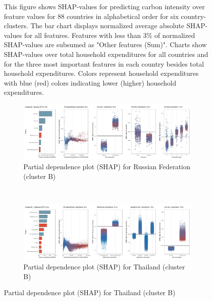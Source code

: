 \begin{figure}[ht!]
    \begin{subcaption2}
     This figure shows SHAP-values for predicting carbon intensity over feature values for 88 countries in alphabetical order for six country-clusters. The bar chart displays normalized average absolute SHAP-values for all features. Features with less than 3\% of normalized SHAP-values are subsumed as "Other features (Sum)". Charts show SHAP-values over total household expenditures for all countries and for the three most important features in each country besides total household expenditures. Colors represent household expenditures with blue (red) colors indicating lower (higher) household expenditures.
     \end{subcaption2}
\end{figure}

\begin{figure}[ht!]\ContinuedFloat
    \centering
   \begin{subfigure}[b]{\textwidth}
   \centering
         \caption{Partial dependence plot (SHAP) for Russian Federation (cluster B)}
         \label{fig:5b_RUS}
         \includegraphics[width=\textwidth]{Figure 5b/Figure_5b_RUS}
         \end{subfigure}
    \\
    \vspace{0.5cm}
    \begin{subfigure}[b]{\textwidth}
    \centering
         \caption{Partial dependence plot (SHAP) for Thailand (cluster B)}
         \label{fig:5b_THA}
         \includegraphics[width=\textwidth]{Figure 5b/Figure_5b_THA}
         \end{subfigure}

\end{figure}
